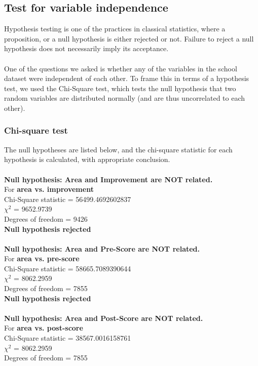 \documentclass[10pt]{article}
\begin{document}
\subsection{Test for variable independence}
Hypothesis testing is one of the practices in classical statistics, where a proposition, or a null hypothesis is either rejected or not. Failure to reject a null hypothesis does not necessarily imply its acceptance.\\\\
One of the questions we asked is whether any of the variables in the school dataset were independent of each other. To frame this in terms of a hypothesis test, we used the Chi-Square test, which tests the null hypothesis that two random variables are distributed normally (and are thus uncorrelated to each other).
\subsubsection{Chi-square test}
The null hypotheses are listed below, and the chi-square statistic for each hypothesis is calculated, with appropriate conclusion.\\\\
\textbf{Null hypothesis: Area and Improvement are NOT related.} \\
 For \textbf{area vs. improvement}\\
 Chi-Square statistic = 56499.4692602837\\
 ${\chi}^2$ = 9652.9739\\
 Degrees of freedom = 9426\\
 \textbf{Null hypothesis rejected}\\
\\
\textbf{Null hypothesis: Area and Pre-Score are NOT related.}\\
 For \textbf{area vs. pre-score}\\
 Chi-Square statistic = 58665.7089390644\\
 ${\chi}^2$ = 8062.2959\\
 Degrees of freedom = 7855\\
 \textbf{Null hypothesis rejected}\\
\\
\textbf{Null hypothesis: Area and Post-Score are NOT related.}\\
 For \textbf{area vs. post-score}\\
 Chi-Square statistic = 38567.0016158761\\
 ${\chi}^2$ = 8062.2959\\
 Degrees of freedom = 7855\\
\end{document}
